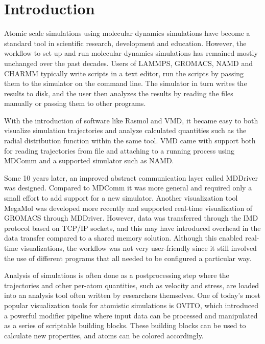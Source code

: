 \documentclass[12pt,a4paper,final]{iopart}
\begin{document}
\section{Introduction}
Atomic scale simulations using molecular dynamics simulations have become a standard tool in scientific research, development and education\cite{frenkel2001understanding,StatisticalAndThermalPhysics-Gould-2006}.
However, the workflow to set up and run molecular dynamics simulations has remained mostly unchanged over the past decades.
Users of LAMMPS\cite{Plimpton1995Fast}, GROMACS\cite{berendsen1995gromacs}, NAMD\cite{nelson1996namd} and CHARMM\cite{brooks2009charmm} typically write
scripts in a text editor, run the scripts by passing them to the simulator on the command line. 
The simulator in turn writes the results to disk, and the user then analyzes the results
by reading the files manually or passing them to other programs.

With the introduction of software like Rasmol\cite{sayle1995rasmol} and VMD\cite{Humphrey1996Vmd},
it became easy to both visualize simulation trajectories and analyze calculated quantities such as the radial distribution function within the same tool. 
VMD came with support both for reading trajectories from file and attaching to a
running process using MDComm\cite{nelson1995mdscope} and a supported simulator such as NAMD.

Some 10 years later, an improved abstract communication layer called MDDriver\cite{delalande2009complex} was designed.
Compared to MDComm it was more general and required only a small effort to add support for a new simulator. Another visualization tool MegaMol\cite{grottel2015megamol} was developed more recently and supported real-time visualization of GROMACS through MDDriver.
However, data was transferred through the IMD protocol based on TCP/IP sockets\cite{delalande2009complex}, and this may have introduced
overhead in the data transfer compared to a shared memory solution.
Although this enabled real-time visualizations, the workflow was not very user-friendly since it still involved
the use of different programs that all needed to be configured a particular way.

Analysis of simulations is often done as a postprocessing step where the trajectories and other 
per-atom quantities, such as velocity and stress, are loaded into an analysis tool often written by researchers themselves.
One of today's most popular visualization tools for atomistic simulations is OVITO\cite{Stukowski2009Visualization},
which introduced a powerful modifier pipeline where input data can be processed and manipulated as a series of scriptable building blocks.
These building blocks can be used to calculate new properties, and atoms can be colored accordingly.
\end{document}
